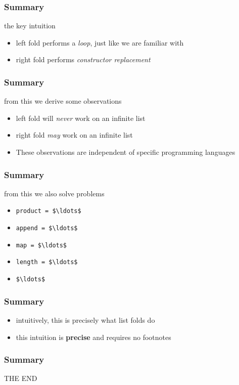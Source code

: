 \begin{frame}
\frametitle{Summary}
\begin{block}{the key intuition}
\begin{itemize}
\item left fold performs a \emph{loop}, just like we are familiar with
\item right fold performs \emph{constructor replacement}
\end{itemize}
\end{block}
\end{frame}

\begin{frame}
\frametitle{Summary}
\begin{block}{from this we derive some observations}
\begin{itemize}
\item left fold will \emph{never} work on an infinite list
\item right fold \emph{may} work on an infinite list
\item These observations are independent of specific programming languages
\end{itemize}
\end{block}
\end{frame}

\begin{frame}[fragile]
\frametitle{Summary}
\begin{block}{from this we also solve problems}
\begin{itemize}
\item \lstinline[mathescape]{product = $\ldots$}
\item \lstinline[mathescape]{append = $\ldots$}
\item \lstinline[mathescape]{map = $\ldots$}
\item \lstinline[mathescape]{length = $\ldots$}
\item \lstinline[mathescape]{$\ldots$}
\end{itemize}
\end{block}
\end{frame}

\begin{frame}
\frametitle{Summary}
\begin{block}{}
\begin{itemize}
\item intuitively, this is precisely what list folds do
\item this intuition is \textbf{precise} and requires no footnotes
\end{itemize}
\end{block}
\end{frame}

\begin{frame}
\frametitle{Summary}
\begin{center}
THE END
\end{center}
\end{frame}
